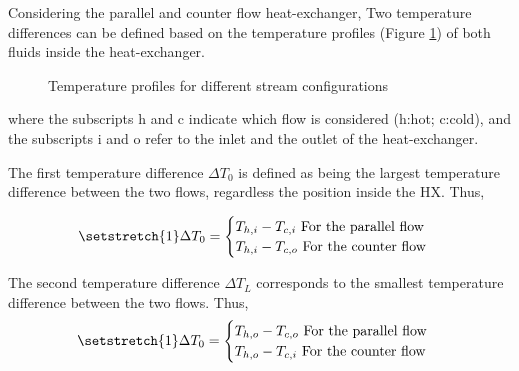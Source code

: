 Considering the parallel and counter flow heat-exchanger, Two temperature differences can be defined based on the temperature profiles (Figure \ref{fig:C3_Tprof}) of both fluids inside the heat-exchanger.

\begin{figure}[h]
\centering
{}\hfill
{}\caption{Temperature profiles for different stream configurations}\label{fig:C3_Tprof}
\end{figure}

where the subscripts h and c indicate which flow is considered (h:hot; c:cold), and the subscripts i and o refer to the inlet and the outlet of the heat-exchanger.

The first temperature difference $\Delta T_0$ is defined as being the largest temperature difference between the two flows, regardless the position inside the HX. Thus,

\begin{equation}
\setstretch{1}
\Delta T_0 =
\begin{cases}
T_{h,i} - T_{c,i} \text{ For the parallel flow}\\
T_{h,i} - T_{c,o} \text{ For the counter flow}\\
\end{cases}\label{eq:C3_DT0}
\end{equation}

The second temperature difference $\Delta T_L$ corresponds to the smallest temperature difference between the two flows. Thus,
\begin{equation}
\setstretch{1}
\Delta T_0 =
\begin{cases}
T_{h,o} - T_{c,o} \text{ For the parallel flow}\\
T_{h,o} - T_{c,i} \text{ For the counter flow}\\
\end{cases}\label{eq:C3_DTL}
\end{equation}

